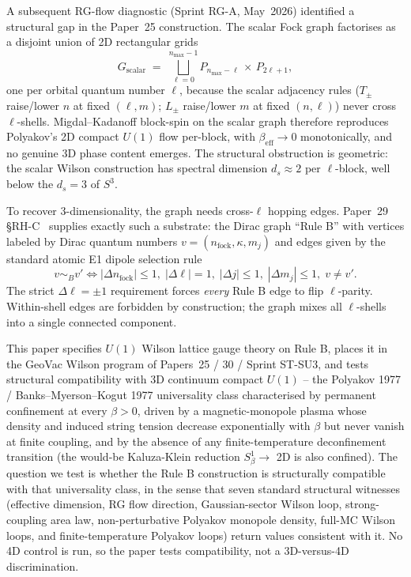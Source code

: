 \documentclass[11pt]{article}
\begin{document}
A subsequent RG-flow diagnostic (Sprint RG-A, May~2026) identified a structural
gap in the Paper~25 construction. The scalar Fock graph factorises as a disjoint
union of 2D rectangular grids
\begin{equation}
G_\text{scalar} \;=\; \bigsqcup_{\ell=0}^{n_\text{max}-1}
  P_{n_\text{max}-\ell}\,\times\,P_{2\ell+1},
\end{equation}
one per orbital quantum number $\ell$, because the scalar adjacency rules
($T_\pm$ raise/lower $n$ at fixed $(\ell,m)$; $L_\pm$ raise/lower $m$ at fixed
$(n,\ell)$) never cross $\ell$-shells. Migdal--Kadanoff block-spin on the scalar
graph therefore reproduces Polyakov's 2D compact $U(1)$ flow per-block, with
$\beta_\text{eff}\to 0$ monotonically, and no genuine 3D phase content emerges.
The structural obstruction is geometric: the scalar Wilson construction has
spectral dimension $d_s\approx 2$ per $\ell$-block, well below the $d_s=3$
of $S^3$.

To recover 3-dimensionality, the graph needs cross-$\ell$ hopping edges. Paper~29
\S{}RH-C~\cite{paper29} supplies exactly such a substrate: the Dirac graph
``Rule B'' with vertices labeled by Dirac quantum numbers
$v=(n_\text{fock},\kappa,m_j)$ and edges given by the standard atomic E1 dipole
selection rule
\begin{equation}
v\sim_B v'\iff |\Delta n_\text{fock}|\le 1,\;
|\Delta\ell|=1,\;
|\Delta j|\le 1,\;
|\Delta m_j|\le 1,\;
v\ne v'.
\label{eq:rule_b}
\end{equation}
The strict $\Delta\ell=\pm 1$ requirement forces \emph{every} Rule B edge to
flip $\ell$-parity. Within-shell edges are forbidden by construction; the graph
mixes all $\ell$-shells into a single connected component.

This paper specifies $U(1)$ Wilson lattice gauge theory on Rule B, places it in
the GeoVac Wilson program of Papers~25 / 30 / Sprint ST-SU3, and tests structural
compatibility with 3D continuum compact $U(1)$ -- the Polyakov 1977 / Banks--Myerson--Kogut
1977 universality class characterised by permanent confinement at every $\beta>0$,
driven by a magnetic-monopole plasma whose density and induced string tension
decrease exponentially with $\beta$ but never vanish at finite coupling, and by
the absence of any finite-temperature deconfinement transition (the would-be
Kaluza-Klein reduction $S^1_\beta\to$ 2D is also confined). The question we
test is whether the Rule B construction is structurally compatible with that
universality class, in the sense that seven standard structural witnesses
(effective dimension, RG flow direction, Gaussian-sector Wilson loop,
strong-coupling area law, non-perturbative Polyakov monopole density, full-MC
Wilson loops, and finite-temperature Polyakov loops) return values
consistent with it.  No 4D control is run, so the paper tests compatibility,
not a 3D-versus-4D discrimination.
\end{document}
